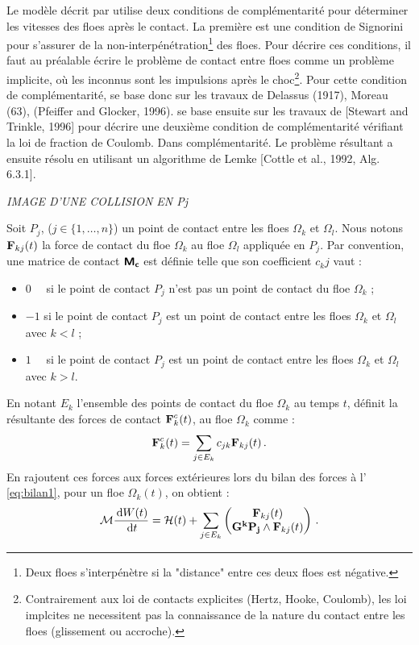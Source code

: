 Le modèle décrit par \parencite[p.5892]{rabatel2015dynamics} utilise deux conditions de complémentarité pour déterminer les vitesses des floes après le contact. La première est une condition de Signorini \parencite{signorini1933sopra} pour s'assurer de la non-interpénétration\footnote{Deux floes s'interpénètre si la "distance" entre ces deux floes est négative.} des floes. Pour décrire ces conditions, il faut au préalable écrire le problème de contact entre floes comme un problème implicite, où les inconnus sont les impulsions après le choc\footnote{Contrairement aux loi de contacts explicites (Hertz, Hooke, Coulomb), les loi implcites ne necessitent pas la connaissance de la nature du contact entre les floes (glissement ou accroche).}. Pour cette condition de complémentarité, \citeauthor{rabatel2015thesis} se base donc sur les travaux de Delassus (1917), Moreau (63), (Pfeiffer and Glocker, 1996). \citeauthor{rabatel2015thesis} se base ensuite sur les travaux de [Stewart and Trinkle, 1996] pour décrire une deuxième condition de complémentarité vérifiant la loi de fraction de Coulomb. Dans \parencite[p.5892]{rabatel2015dynamics}complémentarité. Le problème résultant a ensuite résolu en utilisant un algorithme de Lemke [Cottle et al., 1992, Alg. 6.3.1]. 

\textit{IMAGE D'UNE COLLISION EN Pj}

Soit $P_j$, ($j \in \{1,\ldots,n\}$) un point de contact entre les floes $\Omega_k$ et $\Omega_l$. Nous notons $\bm{\mathrm{F}}_{kj}(t)$ la force de contact du floe $\Omega_k$ au floe $\Omega_l$ appliquée en $P_j$. Par convention, une matrice de contact $\bm{\mathsf{M_c}}$ est définie telle que son coefficient $c_kj$ vaut :
\begin{itemize}
    \item $0\,\,\,\,\,\, $ si le point de contact $P_j$ n’est pas un point de contact du floe $\Omega_k$ ;
    \item $-1$ si le point de contact $P_j$ est un point de contact entre les floes $\Omega_k$ et $\Omega_l$ avec $k < l$ ;
    \item $1\,\,\,\,\,\, $ si le point de contact $P_j$ est un point de contact entre les floes $\Omega_k$ et $\Omega_l$ avec $k > l$.
\end{itemize}
En notant $E_k$ l’ensemble des points de contact du floe $\Omega_k$ au temps $t$, \parencite[p.26]{rabatel2015thesis} définit la résultante des forces de contact $\bm{\mathrm{F}}^c_k(t)$, au floe $\Omega_k$ comme :
$$
\bm{\mathrm{F}}^c_k(t) = \sum_{j \in E_k} c_{jk} \bm{\mathrm{F}}_{kj}(t) \,.
$$
En rajoutent ces forces aux forces extérieures lors du bilan des forces à l' \cref{eq:bilan1}, pour un floe $\Omega_k(t)$, on obtient :
\begin{align} \label{eq:bilan1}
    \mathcal{M} \frac{\diff W(t)}{\diff t} = \mathcal{H}(t) + \sum_{j \in E_k} \begin{pmatrix}
        \bvec{F}_{kj}(t) \\ \bvec{G^kP_j} \wedge \bvec{F}_{kj}(t) 
    \end{pmatrix} \,.
\end{align}



